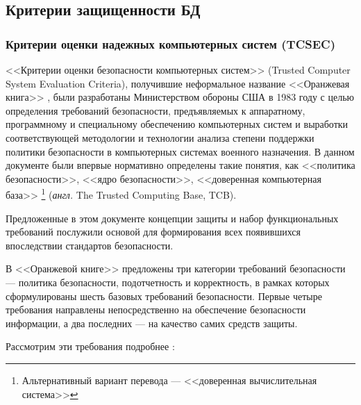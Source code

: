 \subsection{Критерии защищенности БД}

\subsubsection{Критерии оценки надежных компьютерных систем (TCSEC)}
<<Критерии оценки безопасности компьютерных систем>> (Trusted Computer System Evaluation Criteria),
получившие неформальное название <<Оранжевая книга>> \cite{OrangeBook}, были разработаны Министерством обороны
США в 1983 году с целью определения требований безопасности, предъявляемых к аппаратному,
программному и специальному обеспечению компьютерных систем и выработки соответствующей
методологии и технологии анализа степени поддержки политики безопасности в компьютерных
системах военного назначения. В данном документе были впервые нормативно определены такие
понятия, как <<политика безопасности>>, <<ядро безопасности>>, <<доверенная компьютерная база>>
\footnote [1]{ Альтернативный вариант перевода --- <<доверенная вычислительная система>> } (\textit{англ.} The Trusted Computing Base, TCB).

Предложенные в этом документе концепции защиты и набор функциональных требований послужили
основой для формирования всех появившихся впоследствии стандартов безопасности.

В <<Оранжевой книге>> предложены три категории требований безопасности --- политика безопасности,
подотчетность и корректность, в рамках которых сформулированы шесть базовых требований безопасности.
Первые четыре требования направлены непосредственно на обеспечение безопасности информации,
а два последних --- на качество самих средств защиты.

Рассмотрим эти требования подробнее \cite{OrangeBook}:

